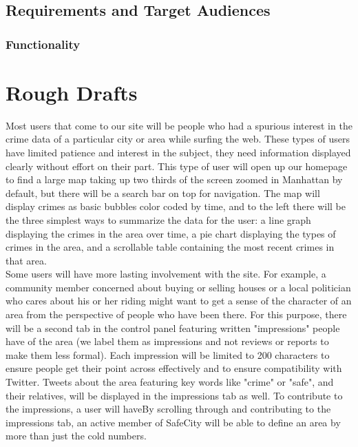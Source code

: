 \documentclass[paper=a4, fontsize=11pt]{scrartcl} %
\numberwithin{equation}{section} %
\numberwithin{figure}{section} %
\numberwithin{table}{section} %
\begin{document}

\subsection{Requirements and Target Audiences}


\subsubsection{Functionality}




\section{Rough Drafts}

Most users that come to our site will be people who had a spurious interest in the crime data of a particular city or area while surfing the web. These types of users have limited patience and interest in the subject, they need information displayed clearly without effort on their part. This type of user will open up our homepage to find a large map taking up two thirds of the screen zoomed in Manhattan by default, but there will be a search bar on top for navigation. The map will display crimes as basic bubbles color coded by time, and to the left there will be the three simplest ways to summarize the data for the user: a line graph displaying the crimes in the area over time, a pie chart displaying the types of crimes in the area, and a scrollable table containing the most recent crimes in that area. \\


Some users will have more lasting involvement with the site. For example, a community member concerned about buying or selling houses or a local politician who cares about his or her riding might want to get a sense of the character of an area from the perspective of people who have been there. For this purpose, there will be a second tab in the control panel featuring written "impressions" people have of the area (we label them as impressions and not reviews or reports to make them less formal). Each impression will be limited to 200 characters to ensure people get their point across effectively and to ensure compatibility with Twitter. Tweets about the area featuring key words like "crime" or "safe", and their relatives, will be displayed in the impressions tab as well. To contribute to the impressions, a user will haveBy scrolling through and contributing to the impressions tab, an active member of SafeCity will be able to define an area by more than just the cold numbers. 
\end{document}
